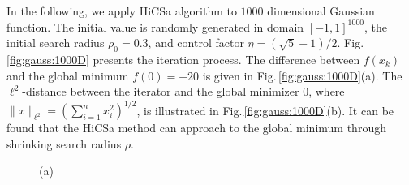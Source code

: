 \documentclass[final,1p,times]{elsarticle}
\begin{document}
In the following, we apply HiCSa algorithm to $1000$ dimensional
Gaussian function. The initial value is randomly generated in
domain $[-1,1]^{1000}$, the initial search radius $\rho_0 = 0.3$,
and control factor $\eta=(\sqrt{5}-1)/2$. 
Fig.\,\ref{fig:gauss:1000D} presents the iteration process.
The difference between $f(x_k)$ and the global minimum
$f(0)=-20$ is given in Fig.\,\ref{fig:gauss:1000D}(a). The
$\ell^2$-distance between the iterator and the global minimizer
$0$, where
$\|x\|_{\ell^2}=\left(\sum_{i=1}^n x_i^2 \right)^{1/2}$,
is illustrated in Fig.\,\ref{fig:gauss:1000D}(b). 
It can be found that the HiCSa method can approach to the global
minimum through shrinking search radius $\rho$.
\begin{figure}[!htbp]
	\begin{minipage}[b]{0.5\linewidth}
	\centerline{(a) }
	\end{minipage}
	\begin{minipage}[b]{0.5\linewidth}
	\centering{
}
\end{minipage}
\end{figure}
\end{document}

